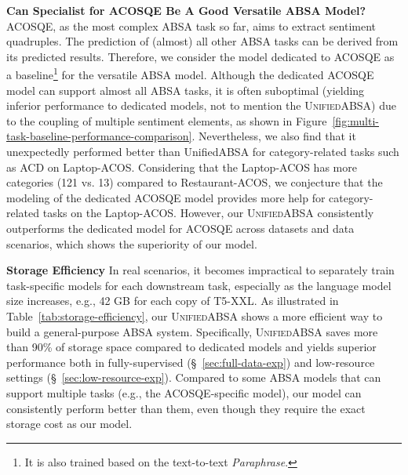 \documentclass[11pt]{article}
\newcommand{\UnifiedABSA}{\textsc{UnifiedABSA}\xspace}
\begin{document}
\noindent\textbf{Can Specialist for ACOSQE Be A Good Versatile ABSA Model?} \quad ACOSQE, as the most complex ABSA task so far, aims to extract sentiment quadruples. The prediction of (almost) all other ABSA tasks can be derived from its predicted results. Therefore, we consider the model dedicated to ACOSQE as a baseline\footnote{It is also trained based on the text-to-text \emph{Paraphrase}.} for the versatile ABSA model. Although the dedicated ACOSQE model can support almost all ABSA tasks, it is often suboptimal (yielding inferior performance to dedicated models, not to mention the \UnifiedABSA) due to the coupling of multiple sentiment elements, as shown in Figure~\ref{fig:multi-task-baseline-performance-comparison}. Nevertheless, we also find that it unexpectedly performed better than UnifiedABSA for category-related tasks such as ACD on Laptop-ACOS. Considering that the Laptop-ACOS has more categories (121 vs. 13) compared to Restaurant-ACOS, we conjecture that the modeling of the dedicated ACOSQE model provides more help for category-related tasks on the Laptop-ACOS. However, our \UnifiedABSA consistently outperforms the dedicated model for ACOSQE across datasets and data scenarios, which shows the superiority of our model.



\begin{table}[h]
\centering

\caption{Comparison of the storage space required by different models to support 11 ABSA tasks. $T$ denotes the storage space size occupied by T5.}
\label{tab:storage-efficiency}
\end{table}
 

\noindent\textbf{Storage Efficiency} \quad In real scenarios, it becomes impractical to separately train task-specific models for each downstream task, especially as the language model size increases, e.g., 42 GB for each copy of T5-XXL. As illustrated in Table~\ref{tab:storage-efficiency}, our \UnifiedABSA shows a more efficient way to build a general-purpose ABSA system. Specifically, \UnifiedABSA saves more than 90\% of storage space compared to dedicated models and yields superior performance both in fully-supervised (\S~\ref{sec:full-data-exp}) and low-resource settings (\S~\ref{sec:low-resource-exp}). Compared to some ABSA models that can support multiple tasks (e.g., the ACOSQE-specific model), our model can consistently perform better than them, even though they require the exact storage cost as our model.
\end{document}
